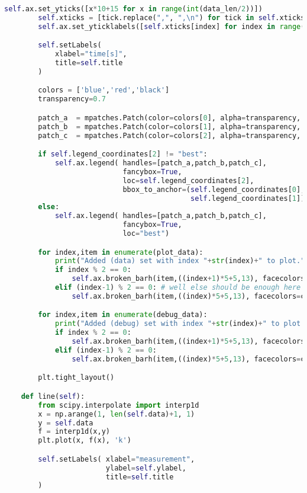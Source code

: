 \begin{lstlisting}[language=Python,caption=myplot.py]
        self.ax.set_yticks([x*10+15 for x in range(int(data_len/2))])
        self.xticks = [tick.replace(",", ",\n") for tick in self.xticks]
        self.ax.set_yticklabels([self.xticks[index] for index in range(int(data_len/2))])

        self.setLabels(
            xlabel="time[s]",
            title=self.title
        )

        colors = ['blue','red','black']
        transparency=0.7

        patch_a  = mpatches.Patch(color=colors[0], alpha=transparency, label="data sent")
        patch_b  = mpatches.Patch(color=colors[1], alpha=transparency, label='ack sent')
        patch_c  = mpatches.Patch(color=colors[2], alpha=transparency, label="ack received")

        if self.legend_coordinates[2] != "best":
            self.ax.legend( handles=[patch_a,patch_b,patch_c],
                            fancybox=True,
                            loc=self.legend_coordinates[2],
                            bbox_to_anchor=(self.legend_coordinates[0],
                                            self.legend_coordinates[1]))
        else:
            self.ax.legend( handles=[patch_a,patch_b,patch_c],
                            fancybox=True,
                            loc="best")

        for index,item in enumerate(plot_data):
            print("Added (data) set with index "+str(index)+" to plot.")
            if index % 2 == 0:
                self.ax.broken_barh(item,((index+1)*5+5,13), facecolors=colors[0], alpha=0.5)
            elif (index-1) % 2 == 0: # well else should be enough here :)
                self.ax.broken_barh(item,((index)*5+5,13), facecolors=colors[1], alpha=0.5)

        for index,item in enumerate(debug_data):
            print("Added (debug) set with index "+str(index)+" to plot.")
            if index % 2 == 0:
                self.ax.broken_barh(item,((index+1)*5+5,13), facecolors=colors[2], alpha=0.5)
            elif (index-1) % 2 == 0:
                self.ax.broken_barh(item,((index)*5+5,13), facecolors=colors[2], alpha=0.5)

        plt.tight_layout()

    def line(self):
        from scipy.interpolate import interp1d
        x = np.arange(1, len(self.data)+1, 1)
        y = self.data
        f = interp1d(x,y)
        plt.plot(x, f(x), 'k')

        self.setLabels( xlabel="measurement",
                        ylabel=self.ylabel,
                        title=self.title
        )


\end{lstlisting}
